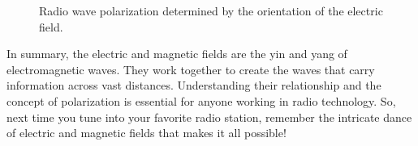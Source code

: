 \begin{figure}[h]
    \centering
    \caption{Radio wave polarization determined by the orientation of the electric field.}
    \label{fig:polarization}
\end{figure}

In summary, the electric and magnetic fields are the yin and yang of electromagnetic waves. They work together to create the waves that carry information across vast distances. Understanding their relationship and the concept of polarization is essential for anyone working in radio technology. So, next time you tune into your favorite radio station, remember the intricate dance of electric and magnetic fields that makes it all possible!
